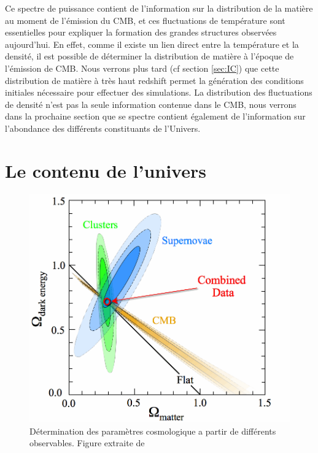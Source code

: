 
Ce spectre de puissance contient de l'information sur la distribution de la matière au moment de l'émission du \ac{CMB}, et ces fluctuations de température sont essentielles pour expliquer la formation des grandes structures observées aujourd'hui.
En effet, comme il existe un lien direct entre la température et la densité, il est possible de déterminer la distribution de matière à l'époque de l'émission de \ac{CMB}.
Nous verrons plus tard (cf section \ref{sec:IC}) que cette distribution de matière à très haut redshift permet la génération des conditions initiales nécessaire pour effectuer des simulations.
La distribution des fluctuations de densité n'est pas la seule information contenue dans le \ac{CMB}, nous verrons dans la prochaine section que se spectre contient également de l'information sur l'abondance des différents constituants de l'Univers.

\section{Le contenu de l'univers}
\label{cosmoparam}

\begin{figure}[bth]
        \includegraphics[width=.95\linewidth]{img/01/cosmoparam.png} 
        \caption[Determination des paramètres cosmologique]{Détermination des paramètres cosmologique a partir de différents observables. Figure extraite de \cite{2008ApJ...686..749K}}
 		\label{fig:cosmoparam}
\end{figure}

